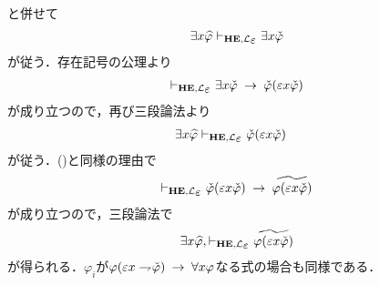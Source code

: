 \begin{metaprf}
\begin{description}
\begin{align}
				\end{align}
				と併せて
				\begin{align}
					\exists x \widehat{\varphi} \provable{\mbox{{\bf HE}},\lang{\varepsilon}} \exists x \check{\varphi}
				\end{align}
				が従う．存在記号の公理より
				\begin{align}
					\provable{\mbox{{\bf HE}},\lang{\varepsilon}} \exists x \check{\varphi} \rarrow \check{\varphi}(\varepsilon x \check{\varphi})
				\end{align}
				が成り立つので，再び三段論法より
				\begin{align}
					\exists x \widehat{\varphi} &\provable{\mbox{{\bf HE}},\lang{\varepsilon}} \check{\varphi}(\varepsilon x \check{\varphi})
				\end{align}
				が従う．()と同様の理由で
				\begin{align}
					\provable{\mbox{{\bf HE}},\lang{\varepsilon}} \check{\varphi}(\varepsilon x \check{\varphi}) \rarrow  \widetilde{\varphi(\varepsilon x \check{\varphi})}
				\end{align}
				が成り立つので，三段論法で
				\begin{align}
					\exists x \widehat{\varphi}, \provable{\mbox{{\bf HE}},\lang{\varepsilon}} \widetilde{\varphi(\varepsilon x \check{\varphi})}
				\end{align}
				が得られる．$\varphi_{i}$が$\varphi(\varepsilon x \rightharpoondown\hspace{-0.25em} \check{\varphi}) \hspace{0.25em}\rightarrow\hspace{0.25em} \forall x \varphi$なる式の場合も同様である．
				

\end{description}
\end{metaprf}
